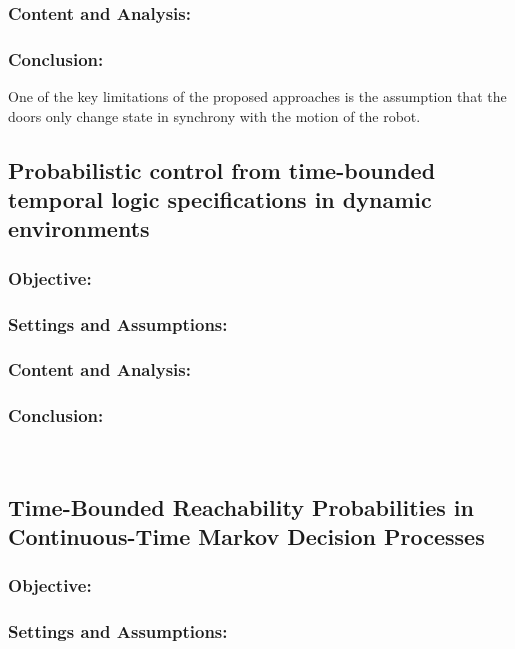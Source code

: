 \documentclass{article}
\begin{document}
\subsubsection{Content and Analysis:}

\subsubsection{Conclusion:}

One of the key limitations of the proposed approaches is the assumption that the doors only change state in synchrony with the motion of the robot.

\subsection{Probabilistic control from time-bounded temporal logic specifications in dynamic environments}
\subsubsection{Objective:}

\subsubsection{Settings and Assumptions:}

\subsubsection{Content and Analysis:}

\subsubsection{Conclusion:}


\\
\subsection{Time-Bounded Reachability Probabilities in Continuous-Time Markov Decision Processes}
\subsubsection{Objective:}

\subsubsection{Settings and Assumptions:}
\end{document}
